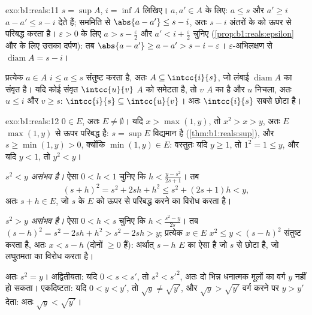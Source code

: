 \begin{solution}{exo:b1:reals:11}
$s = \sup A$, $i = \inf A$ लिखिए। $a, a' \in A$ के लिए: $a \leq s$ और $a'
\geq i$ $a - a' \leq s - i$ देते हैं; सममिति से $\abs{a - a'} \leq s - i$,
अतः $s - i$ अंतरों के  को ऊपर से परिबद्ध करता है। $\varepsilon > 0$
के लिए $a > s - \frac\varepsilon2$ और $a' < i + \frac\varepsilon2$ चुनिए
(\cref{prop:b1:reals:epsilon} और  के लिए उसका दर्पण): तब $\abs{a -
a'} \geq a - a' > s - i - \varepsilon$। $\varepsilon$-अभिलक्षण से
$\operatorname{diam} A = s - i$।

प्रत्येक $a \in A$ $i \leq a \leq s$ संतुष्ट करता है, अतः $A \subseteq
\intcc{i}{s}$, जो लंबाई $\operatorname{diam} A$ का संवृत  है। यदि कोई
संवृत  $\intcc{u}{v}$ $A$ को समेटता है, तो $v$ $A$ का  है
और $u$ निचला, अतः $u \leq i$ और $v \geq s$: $\intcc{i}{s} \subseteq
\intcc{u}{v}$। अतः $\intcc{i}{s}$ सबसे छोटा है।
\end{solution}

\begin{solution}{exo:b1:reals:12}
$0 \in E$, अतः $E \neq \emptyset$। यदि $x > \max(1, y)$, तो $x^2 > x > y$,
अतः $E$ $\max(1, y)$ से ऊपर परिबद्ध है: $s = \sup E$ विद्यमान है
(\cref{thm:b1:reals:sup}), और $s \geq \min(1, y) > 0$, क्योंकि $\min(1, y)
\in E$: वस्तुतः यदि $y \geq 1$, तो $1^2 = 1 \leq y$, और यदि $y < 1$, तो $y^2
< y$।

\emph{$s^2 < y$ असंभव है।} ऐसा $0 < h < 1$ चुनिए कि $h < \frac{y - s^2}{2s +
1}$। तब
\[
(s + h)^2 = s^2 + 2sh + h^2 \leq s^2 + (2s + 1)h < y ,
\]
अतः $s + h \in E$, जो $s$ के $E$ को ऊपर से परिबद्ध करने का विरोध करता है।

\emph{$s^2 > y$ असंभव है।} ऐसा $0 < h < s$ चुनिए कि $h < \frac{s^2 -
y}{2s}$। तब $(s - h)^2 = s^2 - 2sh + h^2 > s^2 - 2sh > y$; प्रत्येक $x \in
E$ $x^2 \leq y < (s - h)^2$ संतुष्ट करता है, अतः $x < s - h$ (दोनों $\geq 0$
हैं): अर्थात् $s - h$ $E$ का ऐसा  है जो $s$ से छोटा है, जो
लघुतमता का विरोध करता है।

अतः $s^2 = y$। अद्वितीयता: यदि $0 < s < s'$, तो $s^2 < s'^2$, अतः दो भिन्न
धनात्मक मूलों का वर्ग $y$ नहीं हो सकता। एकदिष्टता: यदि $0 < y < y'$, तो
$\sqrt y \neq \sqrt{y'}$, और $\sqrt y > \sqrt{y'}$ वर्ग करने पर $y > y'$
देता: अतः $\sqrt y < \sqrt{y'}$।
\end{solution}

